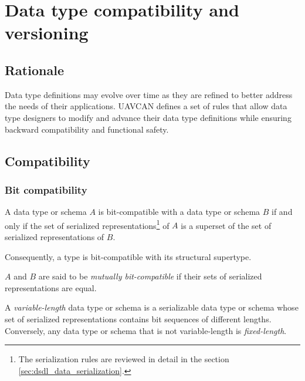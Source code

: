 \section{Data type compatibility and versioning}\label{sec:dsdl_versioning}

\subsection{Rationale}

Data type definitions may evolve over time as they are refined to better address the needs of their applications.
UAVCAN defines a set of rules that allow data type designers to modify and advance their
data type definitions while ensuring backward compatibility and functional safety.

\subsection{Compatibility}

\subsubsection{Bit compatibility}

A data type or schema $A$ is bit-compatible with a data type or schema $B$ if and only if
the set of serialized representations\footnote{The serialization rules are reviewed
in detail in the section \ref{sec:dsdl_data_serialization}.}
of $A$ is a superset of the set of serialized representations of $B$.

Consequently, a type is bit-compatible with its structural supertype.

$A$ and $B$ are said to be \emph{mutually bit-compatible} if
their sets of serialized representations are equal.

A \emph{variable-length} data type or schema is a serializable data type or schema
whose set of serialized representations contains bit sequences of different lengths.
Conversely, any data type or schema that is not variable-length is \emph{fixed-length}.

